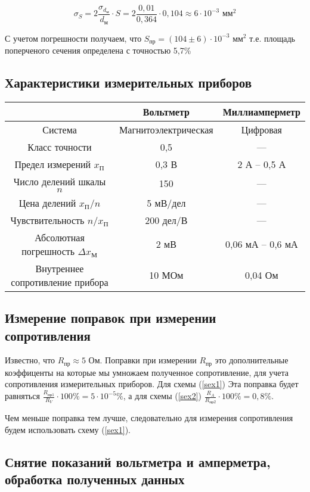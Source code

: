	\begin{equation}
		\sigma_S = 2\frac{\sigma_{d_\text{м}}}{d_\text{м}}\cdot S = 2\frac{0,01}{0,364} \cdot 0,104 \approx 6\cdot 10^{-3} \text{ мм}^2
	\end{equation}
	
	С учетом погрешности получаем, что $S_\text{пр} = \left( 104 \pm 6\right)\cdot 10^{-3} \text{ мм}^2$ т.е. площадь поперченого сечения определена с точностью 5,7\%
	
	\subsection{Характеристики измерительных приборов}
	\begin{longtable}[H]{|c|c|c|}
		\hline
		& Вольтметр & Миллиамперметр\\
		\hline
		Система & Магнитоэлектрическая & Цифровая \\
		Класс точности & 0,5 & --- \\
		Предел измерений $x_\text{П}$ & 0,3 В & 2 А -- 0,5 А\\
		Число делений шкалы $n$ & 150 & ---\\
		Цена делений $x_\text{П}/n$ & 5 мВ/дел & ---\\
		Чувствительность $n/x_\text{П}$ & 200 дел/В & --- \\
		Абсолютная погрешность $\Delta x_\text{М}$ & 2 мВ & 0,06 мА -- 0,6 мА\\
		Внутреннее сопротивление прибора & 10 МОм & 0,04 Ом \\
		\hline
	\end{longtable}
	
	\subsection{Измерение поправок при измерении сопротивления}
	
	 Известно, что $R_\text{пр} \approx 5 $ Ом. Поправки при измерении $R_\text{пр}$ это дополнительные коэффиценты на которые мы умножаем полученное сопротивление, для учета сопротивления измерительных приборов. Для схемы (\ref{sex1}) Эта поправка будет равняться $\frac{R_\text{пр1}}{R_V}\cdot 100\% = 5 \cdot 10^{-5} \%$, а для схемы (\ref{sex2}) $\frac{R_A}{R_\text{пр2}} \cdot 100\% = 0,8\%$.
	
	Чем меньше поправка тем лучше, следовательно для измерения сопротивления будем использовать схему (\ref{sex1}).
	
	\subsection{Снятие показаний вольтметра и амперметра, обработка полученных данных}
	
